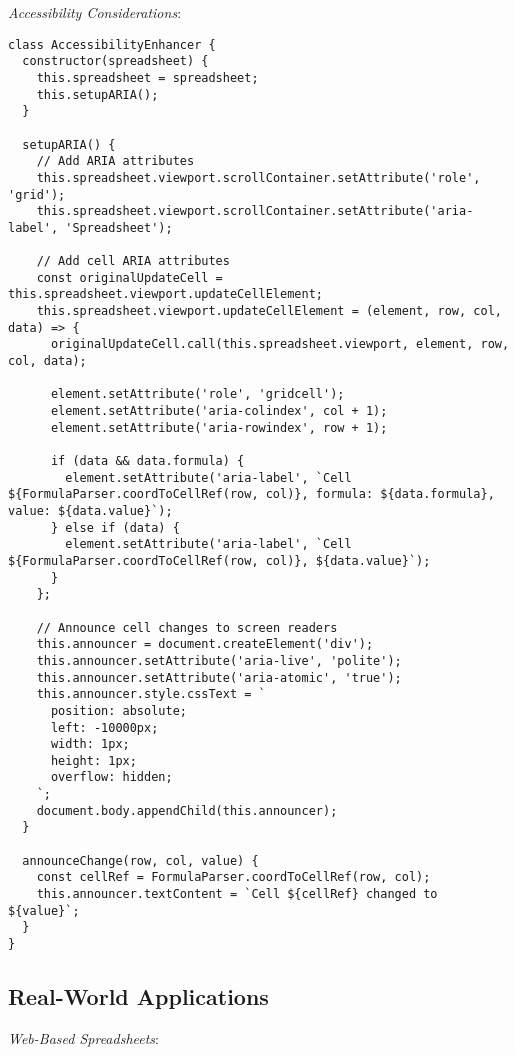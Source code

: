 \documentclass[11pt]{article}
\begin{document}
\emph{Accessibility Considerations}:

\begin{verbatim}
class AccessibilityEnhancer {
  constructor(spreadsheet) {
    this.spreadsheet = spreadsheet;
    this.setupARIA();
  }
  
  setupARIA() {
    // Add ARIA attributes
    this.spreadsheet.viewport.scrollContainer.setAttribute('role', 'grid');
    this.spreadsheet.viewport.scrollContainer.setAttribute('aria-label', 'Spreadsheet');
    
    // Add cell ARIA attributes
    const originalUpdateCell = this.spreadsheet.viewport.updateCellElement;
    this.spreadsheet.viewport.updateCellElement = (element, row, col, data) => {
      originalUpdateCell.call(this.spreadsheet.viewport, element, row, col, data);
      
      element.setAttribute('role', 'gridcell');
      element.setAttribute('aria-colindex', col + 1);
      element.setAttribute('aria-rowindex', row + 1);
      
      if (data && data.formula) {
        element.setAttribute('aria-label', `Cell ${FormulaParser.coordToCellRef(row, col)}, formula: ${data.formula}, value: ${data.value}`);
      } else if (data) {
        element.setAttribute('aria-label', `Cell ${FormulaParser.coordToCellRef(row, col)}, ${data.value}`);
      }
    };
    
    // Announce cell changes to screen readers
    this.announcer = document.createElement('div');
    this.announcer.setAttribute('aria-live', 'polite');
    this.announcer.setAttribute('aria-atomic', 'true');
    this.announcer.style.cssText = `
      position: absolute;
      left: -10000px;
      width: 1px;
      height: 1px;
      overflow: hidden;
    `;
    document.body.appendChild(this.announcer);
  }
  
  announceChange(row, col, value) {
    const cellRef = FormulaParser.coordToCellRef(row, col);
    this.announcer.textContent = `Cell ${cellRef} changed to ${value}`;
  }
}
\end{verbatim}
\subsection{Real-World Applications}
\label{sec:org029990e}

\emph{Web-Based Spreadsheets}:
\end{document}
